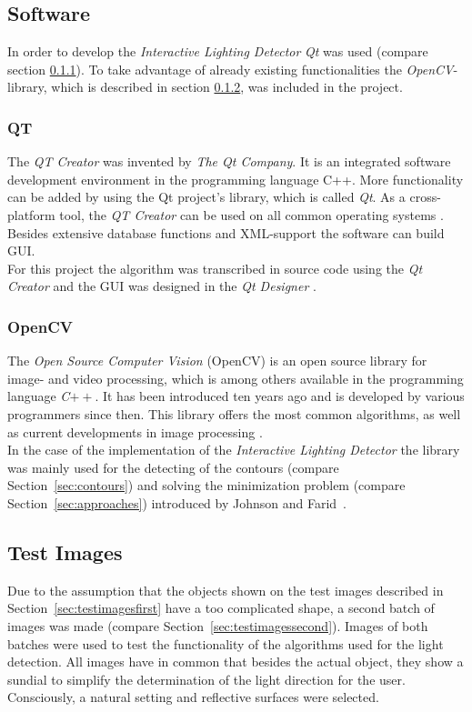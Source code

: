\subsection{Software} \label{sec:Software}

In order to develop the \textit{Interactive Lighting Detector} \textit{Qt} was used (compare section \ref{sec:qt}). To take advantage of already existing functionalities the \textit{OpenCV}-library, which is described in section \ref{sec:opencv}, was included in the project.


\subsubsection{QT} \label{sec:qt}

The \textit{QT Creator} was invented by \textit{The Qt Company}. It is an integrated software development environment in the programming language C++. More functionality can be added by using the Qt project's library, which is called \textit{Qt}.
As a cross-platform tool, the \textit{QT Creator} can be used on all common operating systems \cite{QTCreator}. \\ Besides extensive database functions and XML-support the software can build GUI.\\
For this project the algorithm was transcribed in source code using the \textit{Qt Creator} and the GUI was designed in the \textit{Qt Designer} \cite{website:QtDesigner}.




\subsubsection{OpenCV} \label{sec:opencv}
The \textit{Open Source Computer Vision} (OpenCV) is an open source library for image- and video processing, which is among others available in the programming language \textit{C}$++$. It has been introduced ten years ago and is developed by various programmers since then. This library offers the most common algorithms, as well as current developments in image processing \cite{article:OpenCV}.\\
In the case of the implementation of the \textit{Interactive Lighting Detector} the library was mainly used for the detecting of the contours (compare Section~\ref{sec:contours}) and solving the minimization problem (compare Section~\ref{sec:approaches}) introduced by Johnson and Farid~\cite{Johnson}.


\subsection{Test Images} \label{sec:testimages}
Due to the assumption that the objects shown on the test images described in Section~\ref{sec:testimagesfirst} have a too complicated shape, a second batch of images was made (compare Section~\ref{sec:testimagessecond}). Images of both batches were used to test the functionality of the algorithms used for the light detection. All images have in common that besides the actual object, they show a sundial to simplify the determination of the light direction for the user. Consciously, a natural setting and reflective surfaces were selected.



